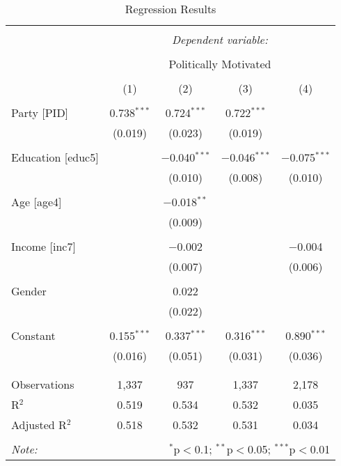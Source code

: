 
\begin{table}[!htbp] \centering 
  \caption{Regression Results} 
  \label{} 
\begin{tabular}{@{\extracolsep{5pt}}lcccc} 
\\[-1.8ex]\hline 
\hline \\[-1.8ex] 
 & \multicolumn{4}{c}{\textit{Dependent variable:}} \\ 
\cline{2-5} 
\\[-1.8ex] & \multicolumn{4}{c}{Politically Motivated} \\ 
\\[-1.8ex] & (1) & (2) & (3) & (4)\\ 
\hline \\[-1.8ex] 
 Party [PID] & 0.738$^{***}$ & 0.724$^{***}$ & 0.722$^{***}$ &  \\ 
  & (0.019) & (0.023) & (0.019) &  \\ 
  & & & & \\ 
 Education [educ5] &  & $-$0.040$^{***}$ & $-$0.046$^{***}$ & $-$0.075$^{***}$ \\ 
  &  & (0.010) & (0.008) & (0.010) \\ 
  & & & & \\ 
 Age [age4] &  & $-$0.018$^{**}$ &  &  \\ 
  &  & (0.009) &  &  \\ 
  & & & & \\ 
 Income [inc7] &  & $-$0.002 &  & $-$0.004 \\ 
  &  & (0.007) &  & (0.006) \\ 
  & & & & \\ 
 Gender &  & 0.022 &  &  \\ 
  &  & (0.022) &  &  \\ 
  & & & & \\ 
 Constant & 0.155$^{***}$ & 0.337$^{***}$ & 0.316$^{***}$ & 0.890$^{***}$ \\ 
  & (0.016) & (0.051) & (0.031) & (0.036) \\ 
  & & & & \\ 
\hline \\[-1.8ex] 
Observations & 1,337 & 937 & 1,337 & 2,178 \\ 
R$^{2}$ & 0.519 & 0.534 & 0.532 & 0.035 \\ 
Adjusted R$^{2}$ & 0.518 & 0.532 & 0.531 & 0.034 \\ 
\hline 
\hline \\[-1.8ex] 
\textit{Note:}  & \multicolumn{4}{r}{$^{*}$p$<$0.1; $^{**}$p$<$0.05; $^{***}$p$<$0.01} \\ 
\end{tabular} 
\end{table} 
